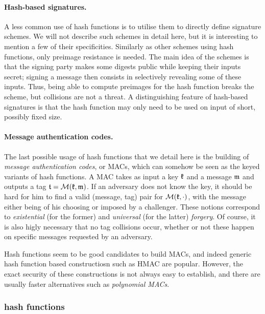 \paragraph{Hash-based signatures.} A less common use of hash functions is to utilise them to directly define signature schemes. We will not describe such schemes in detail
here, but it is interesting to mention a few of their specificities. Similarly as other schemes using hash functions, only preimage resistance is needed. The main
idea of the schemes is that the signing party makes some digests public while keeping their inputs secret; signing a message then consists in selectively revealing some of
these inputs. Thus, being able to compute preimages for the hash function breaks the scheme, but collisions are not a threat.
A distinguishing feature of hash-based signatures is that the hash function may only need to be used on input of short, possibly fixed size. 

\paragraph{Message authentication codes.} The last possible usage of hash functions that we detail here is the building of \emph{message authentication codes}, or MACs, which
can somehow be seen as the keyed variants of hash functions. A MAC takes as input a key $\mathfrak{k}$ and a message $\mathfrak{m}$ and outputs a tag $\mathfrak{t} = \operatorname{\mathcal{M}}(\mathfrak{k}, \mathfrak{m})$.
If an adversary does not know the key, it should be hard for him to find a valid (message, tag) pair for $\operatorname{\mathcal{M}}(\mathfrak{k}, \cdot)$, with the message either being of his choosing
or imposed by a challenger. These notions correspond to \emph{existential} (for the former) and \emph{universal} (for the latter) \emph{forgery}. Of course, it is also
higly necessary that no tag collisions occur, whether or not these happen on specific messages requested by an adversary.

Hash functions seem to be good candidates to build MACs, and indeed generic hash function based constructiosn such as HMAC are popular. However, the exact security of
these constructions is not always easy to establish, and there are usually faster alternatives such as \emph{polynomial MACs}.

\subsubsection{\merkdam hash functions}
\label{sec:mdhf}

